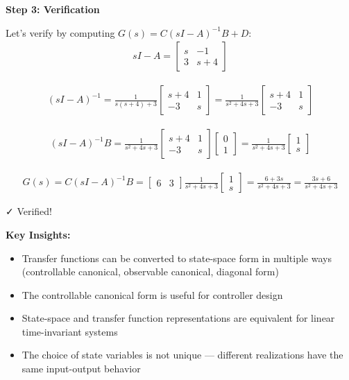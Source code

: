\documentclass[11pt,a4paper]{article}
\begin{document}
\textbf{Step 3: Verification}

Let's verify by computing $G(s) = C(sI - A)^{-1}B + D$:
\begin{align}
sI - A = \begin{bmatrix} s & -1 \\ 3 & s+4 \end{bmatrix}
\end{align}

\begin{align}
(sI - A)^{-1} = \frac{1}{s(s+4) + 3}\begin{bmatrix} s+4 & 1 \\ -3 & s \end{bmatrix} = \frac{1}{s^2+4s+3}\begin{bmatrix} s+4 & 1 \\ -3 & s \end{bmatrix}
\end{align}

\begin{align}
(sI - A)^{-1}B = \frac{1}{s^2+4s+3}\begin{bmatrix} s+4 & 1 \\ -3 & s \end{bmatrix}\begin{bmatrix} 0 \\ 1 \end{bmatrix} = \frac{1}{s^2+4s+3}\begin{bmatrix} 1 \\ s \end{bmatrix}
\end{align}

\begin{align}
G(s) = C(sI-A)^{-1}B = \begin{bmatrix} 6 & 3 \end{bmatrix}\frac{1}{s^2+4s+3}\begin{bmatrix} 1 \\ s \end{bmatrix} = \frac{6 + 3s}{s^2+4s+3} = \frac{3s+6}{s^2+4s+3}
\end{align}

✓ Verified!

\textbf{Key Insights:}
\begin{itemize}
\item Transfer functions can be converted to state-space form in multiple ways (controllable canonical, observable canonical, diagonal form)
\item The controllable canonical form is useful for controller design
\item State-space and transfer function representations are equivalent for linear time-invariant systems
\item The choice of state variables is not unique — different realizations have the same input-output behavior
\end{itemize}
\end{document}
